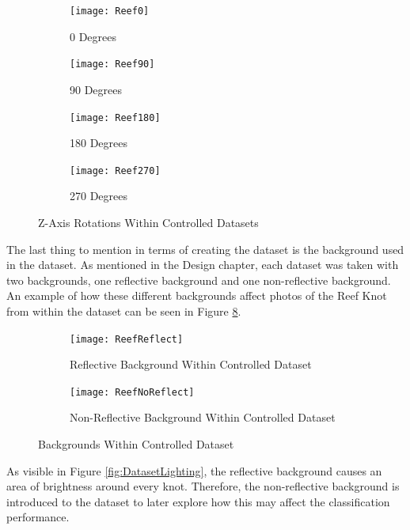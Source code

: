\documentclass{l4proj}
\begin{document}
\begin{figure}[h]
	\begin{subfigure}{.5\textwidth}
		\centering
        \texttt{[image: Reef0]}
        \caption{0 Degrees}
        \label{fig:ZAxisRotation0}
	\end{subfigure}
	\begin{subfigure}{.5\textwidth}
		\centering
        \texttt{[image: Reef90]}
        \caption{90 Degrees}
        \label{fig:ZAxisRotation90}
	\end{subfigure}
	\begin{subfigure}{.5\textwidth}
		\centering
        \texttt{[image: Reef180]}
        \caption{180 Degrees}
        \label{fig:ZAxisRotation180}
	\end{subfigure}
	\begin{subfigure}{.5\textwidth}
		\centering
        \texttt{[image: Reef270]}
        \caption{270 Degrees}
        \label{fig:ZAxisRotation270}
	\end{subfigure}
	\caption{Z-Axis Rotations Within Controlled Datasets}
    \label{fig:DatasetZAxisRotation}
\end{figure}

The last thing to mention in terms of creating the dataset is the background used in the dataset. 
As mentioned in the Design chapter, each dataset was taken with two backgrounds, one reflective background and one non-reflective background.
An example of how these different backgrounds affect photos of the Reef Knot from within the dataset can be seen in Figure \ref{fig:DatasetBackground}.

\begin{figure}[h]
	\begin{subfigure}{.5\textwidth}
		\centering
        \texttt{[image: ReefReflect]}
        \caption{Reflective Background Within Controlled Dataset}
        \label{fig:DatasetReflectBackground}
	\end{subfigure}
	\begin{subfigure}{.5\textwidth}
		\centering
        \texttt{[image: ReefNoReflect]}
        \caption{Non-Reflective Background Within Controlled Dataset}
        \label{fig:DatasetNoReflectBackground}
	\end{subfigure}
	\caption{Backgrounds Within Controlled Dataset}
    \label{fig:DatasetBackground}
\end{figure}

As visible in Figure \ref{fig:DatasetLighting}, the reflective background causes an area of brightness around every knot. 
Therefore, the non-reflective background is introduced to the dataset to later explore how this may affect the classification performance.
\end{document}
